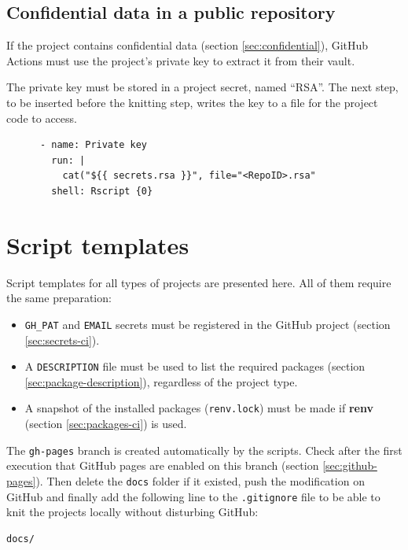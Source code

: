\documentclass[
  12pt,
  american,
  a4paper,
  extrafontsizes,onecolumn,openright
  ]{memoir}
\providecommand{\tightlist}{%
  \setlength{\itemsep}{0pt}\setlength{\parskip}{0pt}}
\begin{document}
\hypertarget{sec:confidentielCI}{%
\subsection{Confidential data in a public repository}\label{sec:confidentielCI}}

If the project contains confidential data (section \ref{sec:confidential}), GitHub Actions must use the project's private key to extract it from their vault.

The private key must be stored in a project secret, named \enquote{RSA}.
The next step, to be inserted before the knitting step, writes the key to a file for the project code to access.

\begin{verbatim}
      - name: Private key
        run: |
          cat("${{ secrets.rsa }}", file="<RepoID>.rsa"
        shell: Rscript {0}
\end{verbatim}

\hypertarget{script-templates}{%
\section{Script templates}\label{script-templates}}

Script templates for all types of projects are presented here.
All of them require the same preparation:

\begin{itemize}
\tightlist
\item
  \texttt{GH\_PAT} and \texttt{EMAIL} secrets must be registered in the GitHub project (section \ref{sec:secrets-ci}).
\item
  A \texttt{DESCRIPTION} file must be used to list the required packages (section \ref{sec:package-description}), regardless of the project type.
\item
  A snapshot of the installed packages (\texttt{renv.lock}) must be made if \textbf{renv} (section \ref{sec:packages-ci}) is used.
\end{itemize}

The \texttt{gh-pages} branch is created automatically by the scripts.
Check after the first execution that GitHub pages are enabled on this branch (section \ref{sec:github-pages}).
Then delete the \texttt{docs} folder if it existed, push the modification on GitHub and finally add the following line to the \texttt{.gitignore} file to be able to knit the projects locally without disturbing GitHub:

\begin{verbatim}
docs/
\end{verbatim}
\end{document}
